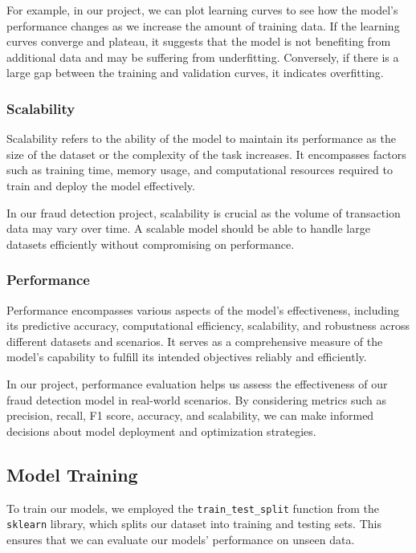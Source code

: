 \documentclass[conference]{IEEEtran}
\begin{document}
For example, in our project, we can plot learning curves to see how the model's performance changes as we increase the amount of training data. If the learning curves converge and plateau, it suggests that the model is not benefiting from additional data and may be suffering from underfitting. Conversely, if there is a large gap between the training and validation curves, it indicates overfitting.

\subsubsection{Scalability}

Scalability refers to the ability of the model to maintain its performance as the size of the dataset or the complexity of the task increases. It encompasses factors such as training time, memory usage, and computational resources required to train and deploy the model effectively.

In our fraud detection project, scalability is crucial as the volume of transaction data may vary over time. A scalable model should be able to handle large datasets efficiently without compromising on performance.

\subsubsection{Performance}

Performance encompasses various aspects of the model's effectiveness, including its predictive accuracy, computational efficiency, scalability, and robustness across different datasets and scenarios. It serves as a comprehensive measure of the model's capability to fulfill its intended objectives reliably and efficiently.

In our project, performance evaluation helps us assess the effectiveness of our fraud detection model in real-world scenarios. By considering metrics such as precision, recall, F1 score, accuracy, and scalability, we can make informed decisions about model deployment and optimization strategies.

\subsection{Model Training}

To train our models, we employed the \texttt{train\_test\_split} function from the \texttt{sklearn} library, which splits our dataset into training and testing sets. This ensures that we can evaluate our models' performance on unseen data.
\end{document}
